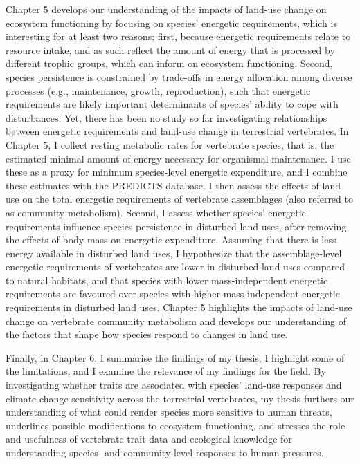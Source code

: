 Chapter 5 develops our understanding of the impacts of land-use change on ecosystem functioning by focusing on species' energetic requirements, which is interesting for at least two reasons: first, because energetic requirements relate to resource intake, and as such reflect the amount of energy that is processed by different trophic groups, which can inform on ecosystem functioning. Second, species persistence is constrained by trade-offs in energy allocation among diverse processes (e.g., maintenance, growth, reproduction), such that energetic requirements are likely important determinants of species' ability to cope with disturbances. Yet, there has been no study so far investigating relationships between energetic requirements and land-use change in terrestrial vertebrates. In Chapter 5, I collect resting metabolic rates for vertebrate species, that is, the estimated minimal amount of energy necessary for organismal maintenance. I use these as a proxy for minimum species-level energetic expenditure, and I combine these estimates with the PREDICTS database. I then assess the effects of land use on the total energetic requirements of vertebrate assemblages (also referred to as community metabolism). Second, I assess whether species' energetic requirements influence species persistence in disturbed land uses, after removing the effects of body mass on energetic expenditure. Assuming that there is less energy available in disturbed land uses, I hypothesize that the assemblage-level energetic requirements of vertebrates are lower in disturbed land uses compared to natural habitats, and that species with lower mass-independent energetic requirements are favoured over species with higher mass-independent energetic requirements in disturbed land uses. Chapter 5 highlights the impacts of land-use change on vertebrate community metabolism and develops our understanding of the factors that shape how species respond to changes in land use.

Finally, in Chapter 6, I summarise the findings of my thesis, I highlight some of the limitations, and I examine the relevance of my findings for the field. By investigating whether traits are associated with species' land-use responses and climate-change sensitivity across the terrestrial vertebrates, my thesis furthers our understanding of what could render species more sensitive to human threats, underlines possible modifications to ecosystem functioning, and stresses the role and usefulness of vertebrate trait data and ecological knowledge for understanding species- and community-level responses to human pressures.

